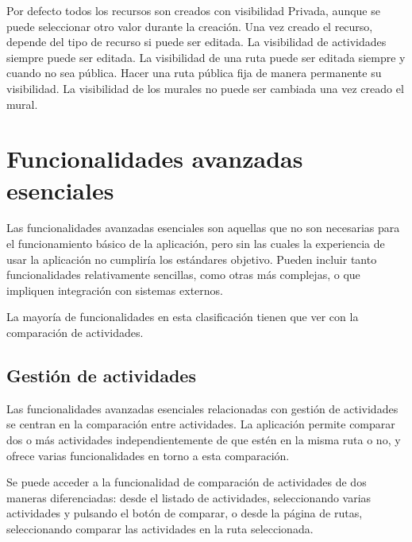 Por defecto todos los recursos son creados con visibilidad Privada, aunque se puede seleccionar otro valor durante la creación. Una vez creado el recurso, depende del tipo de recurso si puede ser editada. La visibilidad de actividades siempre puede ser editada. La visibilidad de una ruta puede ser editada siempre y cuando no sea pública. Hacer una ruta pública fija de manera permanente su visibilidad. La visibilidad de los murales no puede ser cambiada una vez creado el mural.

\section{Funcionalidades avanzadas esenciales}

Las funcionalidades avanzadas esenciales son aquellas que no son necesarias para el funcionamiento básico de la aplicación, pero sin las cuales la experiencia de usar la aplicación no cumpliría los estándares objetivo. Pueden incluir tanto funcionalidades relativamente sencillas, como otras más complejas, o que impliquen integración con sistemas externos.

La mayoría de funcionalidades en esta clasificación tienen que ver con la comparación de actividades.

\subsection{Gestión de actividades}
Las funcionalidades avanzadas esenciales relacionadas con gestión de actividades se centran en la comparación entre actividades. La aplicación permite comparar dos o más actividades independientemente de que estén en la misma ruta o no, y ofrece varias funcionalidades en torno a esta comparación.

Se puede acceder a la funcionalidad de comparación de actividades de dos maneras diferenciadas: desde el listado de actividades, seleccionando varias actividades y pulsando el botón de comparar, o desde la página de rutas, seleccionando comparar las actividades en la ruta seleccionada.

